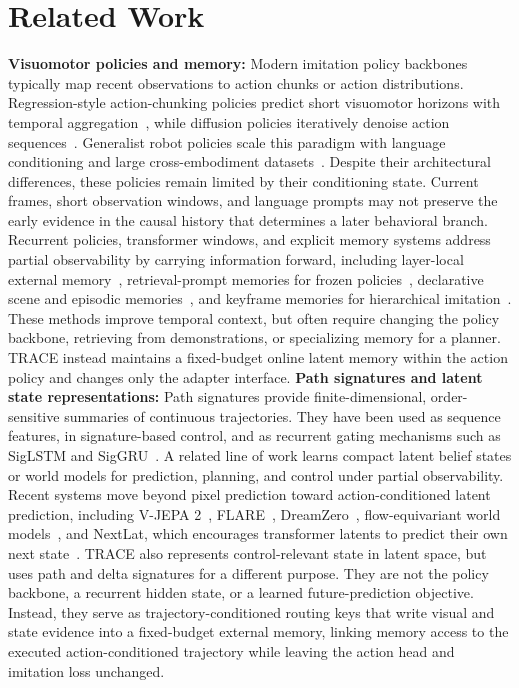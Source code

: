 \documentclass{article}
\begin{document}
\section{Related Work}
\textbf{Visuomotor policies and memory:}
Modern imitation policy backbones typically map recent observations to action chunks or action distributions. Regression-style action-chunking policies predict short visuomotor horizons with temporal aggregation~\citep{zhao2023learning}, while diffusion policies iteratively denoise action sequences~\citep{chi2025diffusion}. Generalist robot policies scale this paradigm with language conditioning and large cross-embodiment datasets~\citep{brohan2022rt1,zitkovich2023rt,o2024open,black2024pi0,shukor2025smolvla,zheng2025xvla,nvidia2025gr00tn1}. Despite their architectural differences, these policies remain limited by their conditioning state. Current frames, short observation windows, and language prompts may not preserve the early evidence in the causal history that determines a later behavioral branch. Recurrent policies, transformer windows, and explicit memory systems address partial observability by carrying information forward, including layer-local external memory~\citep{cherepanov2025elmur}, retrieval-prompt memories for frozen policies~\citep{li2025map}, declarative scene and episodic memories~\citep{lin2025echovla}, and keyframe memories for hierarchical imitation~\citep{buamanee2026bi}. These methods improve temporal context, but often require changing the policy backbone, retrieving from demonstrations, or specializing memory for a planner. TRACE instead maintains a fixed-budget online latent memory within the action policy and changes only the adapter interface. \textbf{Path signatures and latent state representations:} Path signatures provide finite-dimensional, order-sensitive summaries of continuous trajectories. They have been used as sequence features, in signature-based control, and as recurrent gating mechanisms such as SigLSTM and SigGRU~\citep{chevyrev2025primer,kidger2021signatory,rauscher2025shortest,genet2025siggate}. A related line of work learns compact latent belief states or world models for prediction, planning, and control under partial observability. Recent systems move beyond pixel prediction toward action-conditioned latent prediction, including V-JEPA 2~\citep{assran2025v}, FLARE~\citep{zheng2025flare}, DreamZero~\citep{ye2026world}, flow-equivariant world models~\citep{lillemark2026flow}, and NextLat, which encourages transformer latents to predict their own next state~\citep{teoh2025next}. TRACE also represents control-relevant state in latent space, but uses path and delta signatures for a different purpose. They are not the policy backbone, a recurrent hidden state, or a learned future-prediction objective. Instead, they serve as trajectory-conditioned routing keys that write visual and state evidence into a fixed-budget external memory, linking memory access to the executed action-conditioned trajectory while leaving the action head and imitation loss unchanged.
\end{document}
